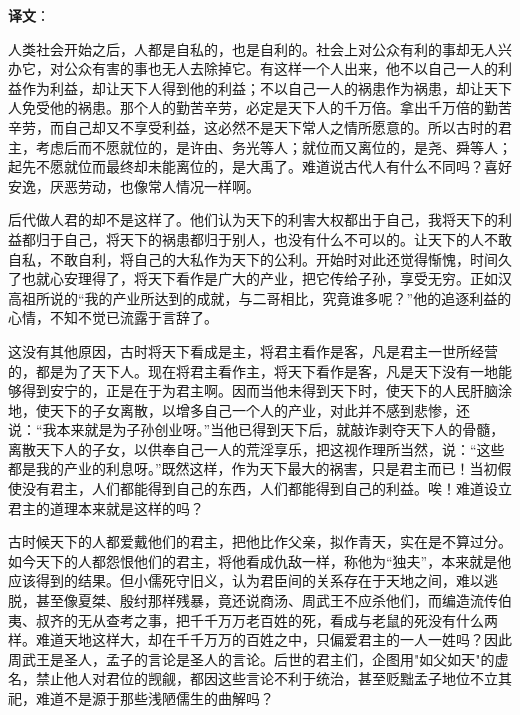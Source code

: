 \documentclass[12pt,UTF-8,openany,a4]{ctexbook}
\begin{document}
\newpage

\begin{Large}
   \noindent \textbf{译文}：
\end{Large}

\vspace{1em}

\begin{large}\yiwen
    
    人类社会开始之后，人都是自私的，也是自利的。社会上对公众有利的事却无人兴办它，对公众有害的事也无人去除掉它。有这样一个人出来，他不以自己一人的利益作为利益，却让天下人得到他的利益；不以自己一人的祸患作为祸患，却让天下人免受他的祸患。那个人的勤苦辛劳，必定是天下人的千万倍。拿出千万倍的勤苦辛劳，而自己却又不享受利益，这必然不是天下常人之情所愿意的。所以古时的君主，考虑后而不愿就位的，是许由、务光等人；就位而又离位的，是尧、舜等人；起先不愿就位而最终却未能离位的，是大禹了。难道说古代人有什么不同吗？喜好安逸，厌恶劳动，也像常人情况一样啊。
    
    后代做人君的却不是这样了。他们认为天下的利害大权都出于自己，我将天下的利益都归于自己，将天下的祸患都归于别人，也没有什么不可以的。让天下的人不敢自私，不敢自利，将自己的大私作为天下的公利。开始时对此还觉得惭愧，时间久了也就心安理得了，将天下看作是广大的产业，把它传给子孙，享受无穷。正如汉高祖所说的“我的产业所达到的成就，与二哥相比，究竟谁多呢？”他的追逐利益的心情，不知不觉已流露于言辞了。
    
    这没有其他原因，古时将天下看成是主，将君主看作是客，凡是君主一世所经营的，都是为了天下人。现在将君主看作主，将天下看作是客，凡是天下没有一地能够得到安宁的，正是在于为君主啊。因而当他未得到天下时，使天下的人民肝脑涂地，使天下的子女离散，以增多自己一个人的产业，对此并不感到悲惨，还说：“我本来就是为子孙创业呀。”当他已得到天下后，就敲诈剥夺天下人的骨髓，离散天下人的子女，以供奉自己一人的荒淫享乐，把这视作理所当然，说：“这些都是我的产业的利息呀。”既然这样，作为天下最大的祸害，只是君主而已！当初假使没有君主，人们都能得到自己的东西，人们都能得到自己的利益。唉！难道设立君主的道理本来就是这样的吗？
    
    古时候天下的人都爱戴他们的君主，把他比作父亲，拟作青天，实在是不算过分。如今天下的人都怨恨他们的君主，将他看成仇敌一样，称他为“独夫”，本来就是他应该得到的结果。但小儒死守旧义，认为君臣间的关系存在于天地之间，难以逃脱，甚至像夏桀、殷纣那样残暴，竟还说商汤、周武王不应杀他们，而编造流传伯夷、叔齐的无从查考之事，把千千万万老百姓的死，看成与老鼠的死没有什么两样。难道天地这样大，却在千千万万的百姓之中，只偏爱君主的一人一姓吗？因此周武王是圣人，孟子的言论是圣人的言论。后世的君主们，企图用"如父如天"的虚名，禁止他人对君位的觊觎，都因这些言论不利于统治，甚至贬黜孟子地位不立其祀，难道不是源于那些浅陋儒生的曲解吗？
    

\end{large}
\end{document}
